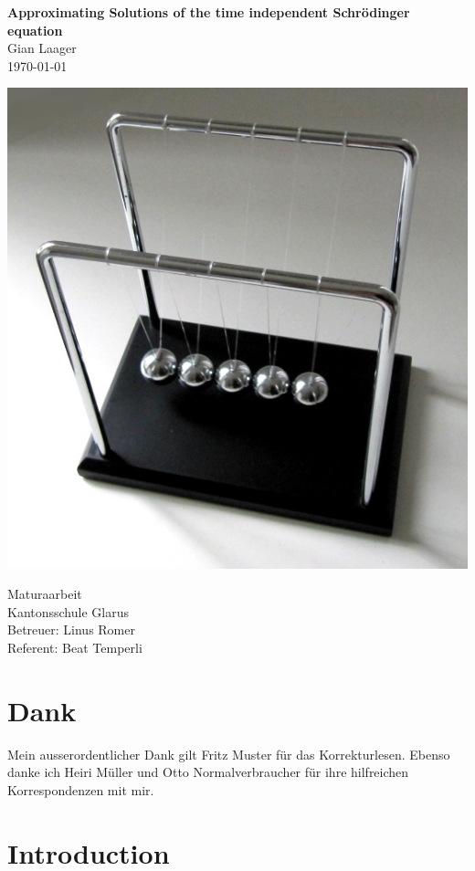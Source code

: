 \documentclass[11pt,DIV=10,final]{scrreprt} %
\begin{document}
\begin{titlepage}
\mbox{}\vspace{0.1\textheight}
\begin{center}
\textbf{\Huge Approximating Solutions of the time independent Schrödinger equation}\\[3ex]
Gian Laager\\
\today
\vspace{0.05\textheight}
\begin{center}
	\includegraphics[width=.7\textwidth]{titelbild.jpg}
\end{center}
\vspace{0.05\textheight}
Maturaarbeit\\
Kantonsschule Glarus\\
Betreuer: Linus Romer\\
Referent: Beat Temperli
\end{center}
\end{titlepage}


\chapter*{Dank}
Mein ausserordentlicher Dank gilt Fritz Muster für das Korrekturlesen. Ebenso danke ich Heiri Müller und Otto Normalverbraucher für ihre hilfreichen Korrespondenzen mit mir.

\tableofcontents %

\chapter{Introduction}  %
\end{document}
